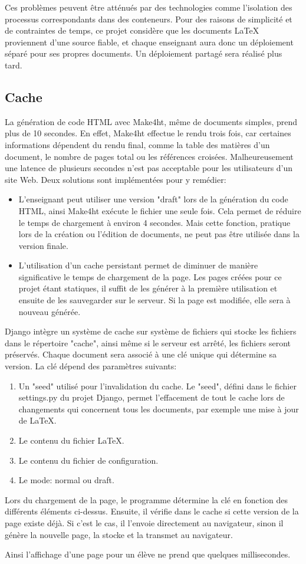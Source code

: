 \documentclass[12pt,titlepage,oneside]{article}
\begin{document}
Ces problèmes peuvent être atténués par des technologies comme l'isolation des processus correspondants dans des conteneurs. Pour des raisons de simplicité et de contraintes de temps, ce projet considère que les documents LaTeX proviennent d'une source fiable, et chaque enseignant aura donc un déploiement séparé pour ses propres documents. Un déploiement partagé sera réalisé plus tard.

\newpage

\subsection{Cache}
La génération de code HTML avec Make4ht, même de documents simples, prend plus de 10 secondes. En effet, Make4ht effectue le rendu trois fois, car certaines informations dépendent du rendu final, comme la table des matières d'un document, le nombre de pages total ou les références croisées. Malheureusement une latence de plusieurs secondes n'est pas acceptable pour les utilisateurs d'un site Web. Deux solutions sont implémentées pour y remédier:
\begin{itemize}
\item L'enseignant peut utiliser une version "draft" lors de la génération du code HTML, ainsi Make4ht exécute le fichier une seule fois. Cela permet de réduire le temps de chargement à environ 4 secondes. Mais cette fonction, pratique lors de la création ou l'édition de documents, ne peut pas être utilisée dans la version finale.
\item L'utilisation d'un cache persistant permet de diminuer de manière significative le temps de chargement de la page. Les pages créées pour ce projet étant statiques, il suffit de les générer à la première utilisation et ensuite de les sauvegarder sur le serveur. Si la page est modifiée, elle sera à nouveau générée.
\end{itemize}
Django intègre un système de cache sur système de fichiers qui stocke les fichiers dans le répertoire "cache", ainsi même si le serveur est arrêté, les fichiers seront préservés. Chaque document sera associé à une clé unique qui détermine sa version. La clé dépend des paramètres suivants:
\begin{enumerate}
\item Un "seed" utilisé pour l'invalidation du cache. Le "seed", défini dans le fichier settings.py du projet Django, permet l'effacement de tout le cache lors de changements qui concernent tous les documents, par exemple une mise à jour de LaTeX.
\item Le contenu du fichier LaTeX.
\item Le contenu du fichier de configuration.
\item Le mode: normal ou draft.
\end{enumerate}
Lors du chargement de la page, le programme détermine la clé en fonction des différents éléments ci-dessus. Ensuite, il vérifie dans le cache si cette version de la page existe déjà. Si c'est le cas, il l'envoie directement au navigateur, sinon il génère la nouvelle page, la stocke et la transmet au navigateur.\par
Ainsi l'affichage d'une page pour un élève ne prend que quelques millisecondes.\par
\end{document}

